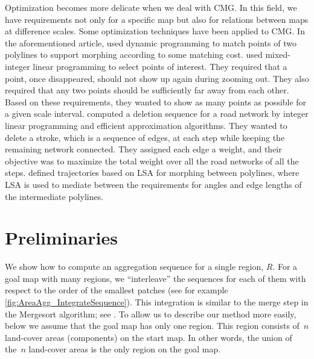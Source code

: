 \documentclass[acmsmall,natbib=false]{acmart}
\begin{document}
Optimization becomes more delicate
when we deal with CMG.
In this field, we have requirements 
not only for a specific map
but also for relations between maps at difference scales. 
%
Some optimization techniques have been applied to CMG.
In the aforementioned article,
\textcite{Noellenburg2008} used dynamic programming
to match points of two polylines to support morphing
according to some matching cost.
\textcite{sahw-oarps-ICAGW13} used 
mixed-integer linear programming 
to select points of interest.
They required that a point, once disappeared, 
should not show up again during zooming out. 
They also required that any two points should be 
sufficiently far away from each other.
Based on these requirements, 
they wanted to show as many points as possible 
for a given scale interval.
\textcite{Chimani2014Eat} computed a deletion sequence
for a road network by integer linear programming
and efficient approximation algorithms.
They wanted to delete a stroke, 
which is a sequence of edges, at each step
while keeping the remaining network connected.
They assigned each edge a weight, 
and their objective was to maximize the total weight 
over all the road networks of all the steps.
\textcite{Peng2013LSA} defined trajectories 
based on LSA for morphing between polylines, 
where LSA is used to mediate between the requirements 
for angles and edge lengths of the intermediate polylines.


\section{Preliminaries}
\label{sec:AreaAgg_Preliminaries}

We show how to compute an aggregation sequence 
for a single region, $R$. 
For a goal map with many regions,
we ``interleave'' the sequences for each of them
with respect to the order of the smallest patches 
(see for example \fig\ref{fig:AreaAgg_IntegrateSequence}).
This integration is similar to the merge step in the 
Mergesort algorithm; 
see \textcite[]{Cormen2009}.
To allow us to describe our method more easily,
below we assume that the goal map has only one region.
This region consists of~$n$ land-cover 
areas (components) on the start map. 
In other words, the union of the~$n$ land-cover areas 
is the only region on the goal map.
\end{document}
